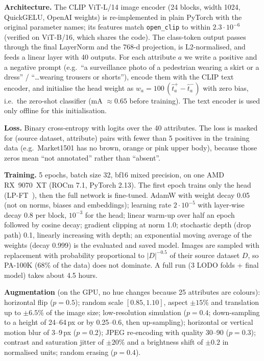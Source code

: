 \documentclass[a4paper, 10pt, conference]{ieeeconf}
\begin{document}
\textbf{Architecture.} The CLIP ViT-L/14 image encoder (24 blocks, width 1024, QuickGELU, OpenAI weights) is re-implemented in plain PyTorch with the original parameter names; its features match \texttt{open\_clip} to within $2.3\cdot10^{-6}$ (verified on ViT-B/16, which shares the code). The class-token output passes through the final LayerNorm and the 768-d projection, is L2-normalised, and feeds a linear layer with 40 outputs. For each attribute $a$ we write a positive and a negative prompt (e.g.\ ``a surveillance photo of a pedestrian wearing a skirt or a dress'' / ``\dots wearing trousers or shorts''), encode them with the CLIP text encoder, and initialise the head weight as $w_a = 100\,(\hat t_a^{+} - \hat t_a^{-})$ with zero bias, i.e.\ the zero-shot classifier (mA $\approx 0.65$ before training). The text encoder is used only offline for this initialisation.

\textbf{Loss.} Binary cross-entropy with logits over the 40 attributes. The loss is masked for (source dataset, attribute) pairs with fewer than 5 positives in the training data (e.g.\ Market1501 has no brown, orange or pink upper body), because those zeros mean ``not annotated'' rather than ``absent''.

\textbf{Training.} 5 epochs, batch size 32, bf16 mixed precision, on one AMD RX~9070~XT (ROCm 7.1, PyTorch 2.13). The first epoch trains only the head (LP-FT~\cite{kumar2022lpft}), then the full network is fine-tuned. AdamW with weight decay 0.05 (not on norms, biases and embeddings); learning rate $2\cdot10^{-5}$ with layer-wise decay 0.8 per block, $10^{-3}$ for the head; linear warm-up over half an epoch followed by cosine decay; gradient clipping at norm 1.0; stochastic depth (drop path) 0.1, linearly increasing with depth; an exponential moving average of the weights (decay 0.999) is the evaluated and saved model. Images are sampled with replacement with probability proportional to $|D|^{-0.5}$ of their source dataset $D$, so PA-100K (68\% of the data) does not dominate. A full run (3 LODO folds + final model) takes about 4.5 hours.

\textbf{Augmentation} (on the GPU, no hue changes because 25 attributes are colours): horizontal flip ($p=0.5$); random scale $[0.85, 1.10]$, aspect $\pm15\%$ and translation up to $\pm6.5\%$ of the image size; low-resolution simulation ($p=0.4$; down-sampling to a height of 24--64\,px or by 0.25--0.6, then up-sampling); horizontal or vertical motion blur of 3--9\,px ($p=0.2$); JPEG re-encoding with quality 30--90 ($p=0.3$); contrast and saturation jitter of $\pm20\%$ and a brightness shift of $\pm0.2$ in normalised units; random erasing ($p=0.4$).
\end{document}
